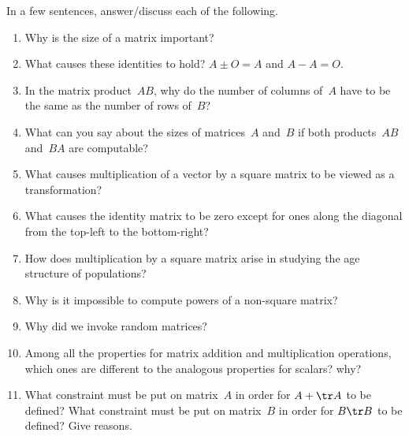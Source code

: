 \begin{exercise}  
In a few sentences, answer\slash discuss each of the following.
\begin{enumerate}
\item Why is the size of a matrix important?

\item What causes these identities to hold? \(A\pm O=A\) and \(A-A=O\).

\item In the matrix product~\(AB\), why do the number of columns of~\(A\) have to be the same as the number of rows of~\(B\)?

\item What can you say about the sizes of matrices~\(A\) and~\(B\) if both products~\(AB\) and~\(BA\) are computable?

\item What causes multiplication of a vector by a square matrix to be viewed as a transformation?

\item What causes the identity matrix to be zero except for ones along the diagonal from the top-left to the bottom-right?

\item How does multiplication by a square matrix arise in studying the age structure of populations?

\item Why is it impossible to compute powers of a non-square matrix?

\item Why did we invoke random matrices?

\item Among all the properties for matrix addition and multiplication operations, which ones are different to the analogous properties for scalars?  why?

\item What constraint must be put on matrix~\(A\) in order for \(A+\tr A\) to be defined?  
What constraint must be put on matrix~\(B\) in order for \(B\tr B\) to be defined?  
Give reasons.

\end{enumerate}
\end{exercise}

